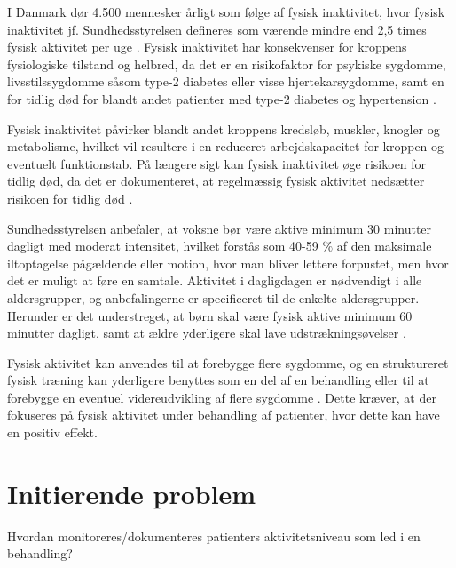 I Danmark dør 4.500 mennesker årligt som følge af fysisk inaktivitet, hvor fysisk inaktivitet jf. Sundhedsstyrelsen defineres som værende mindre end 2,5 times fysisk aktivitet per uge \citep{aagaard2014}. Fysisk inaktivitet har konsekvenser for kroppens fysiologiske tilstand og helbred, da det er en risikofaktor for psykiske sygdomme, livsstilssygdomme såsom type-2 diabetes eller visse hjertekarsygdomme, samt en for tidlig død for blandt andet patienter med type-2 diabetes og hypertension \citep{motionsraad2007}. 

Fysisk inaktivitet påvirker blandt andet kroppens kredsløb, muskler, knogler og metabolisme, hvilket vil resultere i en reduceret arbejdskapacitet for kroppen og eventuelt funktionstab. På længere sigt kan fysisk inaktivitet øge risikoen for tidlig død, da det er dokumenteret, at regelmæssig fysisk aktivitet nedsætter risikoen for tidlig død \citep{motionsraad2007}.

Sundhedsstyrelsen anbefaler, at voksne bør være aktive minimum 30 minutter dagligt med moderat intensitet, hvilket forstås som 40-59 $\%$ af den maksimale iltoptagelse pågældende eller motion, hvor man bliver lettere forpustet, men hvor det er muligt at føre en samtale.
Aktivitet i dagligdagen er nødvendigt i alle aldersgrupper, og anbefalingerne er specificeret til de enkelte aldersgrupper. Herunder er det understreget, at børn skal være fysisk aktive minimum 60 minutter dagligt, samt at ældre yderligere skal lave udstrækningsøvelser \citep{pedersen2011}.

Fysisk aktivitet kan anvendes til at forebygge flere sygdomme, og en struktureret fysisk træning kan yderligere benyttes som en del af en behandling eller til at forebygge en eventuel videreudvikling af flere sygdomme \citep{motionsraad2007}. Dette kræver, at der fokuseres på fysisk aktivitet under behandling af patienter, hvor dette kan have en positiv effekt.



\section{Initierende problem}
Hvordan monitoreres/dokumenteres patienters aktivitetsniveau som led i en behandling?  
